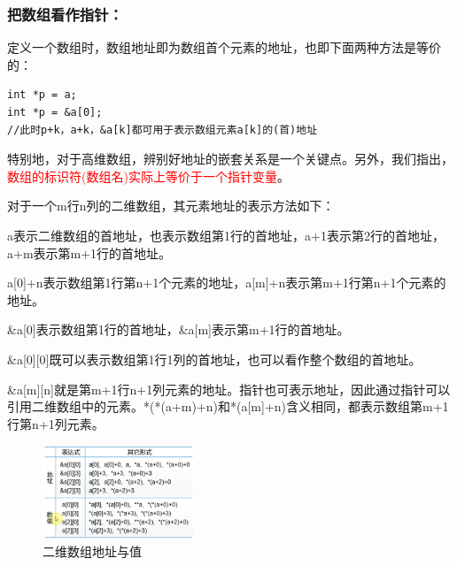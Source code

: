 \documentclass[zihao=-4,UTF8]{report}
\begin{document}
\subsubsection{把数组看作指针：}
定义一个数组时，数组地址即为数组首个元素的地址，也即下面两种方法是等价的：
\begin{lstlisting}
int *p = a;
int *p = &a[0];
//此时p+k，a+k，&a[k]都可用于表示数组元素a[k]的(首)地址
\end{lstlisting}
特别地，对于高维数组，辨别好地址的嵌套关系是一个关键点。另外，我们指出，\textcolor{red}{数组的标识符(数组名)实际上等价于一个指针变量}。\par
{\small\color{gray}对于一个m行n列的二维数组，其元素地址的表示方法如下：\par
a表示二维数组的首地址，也表示数组第1行的首地址，a+1表示第2行的首地址，a+m表示第m+1行的首地址。\par a[0]+n表示数组第1行第n+1个元素的地址，a[m]+n表示第m+1行第n+1个元素的地址。\par \&a[0]表示数组第1行的首地址，\&a[m]表示第m+1行的首地址。 \par\&a[0][0]既可以表示数组第1行1列的首地址，也可以看作整个数组的首地址。 \par\&a[m][n]就是第m+1行n+1列元素的地址。指针也可表示地址，因此通过指针可以引用二维数组中的元素。*(*(a+m)+n)和*(a[m]+n)含义相同，都表示数组第m+1行第n+1列元素。}
\begin{figure}[H]
    \centering
    \includegraphics[width=0.4\textwidth]{pic/二维数组地址与值.png}
    \caption{二维数组地址与值}
\end{figure}
\end{document}
